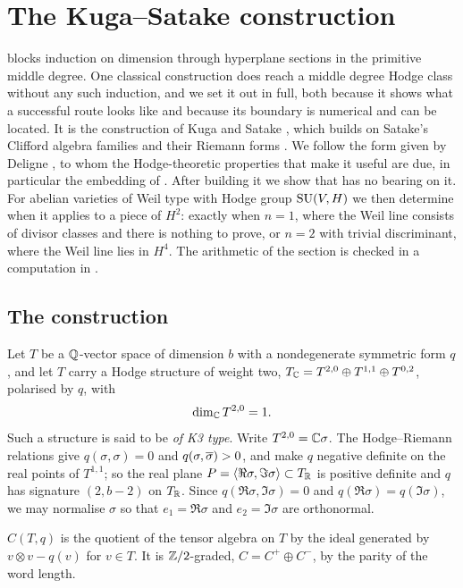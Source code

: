 \section{The Kuga--Satake construction}\label{sec:ks}

 blocks induction on dimension through hyperplane
sections in the primitive middle degree. One classical construction does reach
a middle degree Hodge class without any such induction, and we set it out in
full, both because it shows what a successful route looks like and because
its boundary is numerical and can be located. It is the construction of Kuga
and Satake \cite{KS67}, which builds on Satake's Clifford algebra families and
their Riemann forms \cite{Sat66}. We follow the form given by Deligne
\cite{Del72}, to whom the Hodge-theoretic properties that make it useful are
due, in particular the embedding of . After building it we
show that  has no bearing on it. For abelian varieties of
Weil type with Hodge group $\operatorname{SU}(V,H)$ we then determine when it applies to a
piece of $H^{2}$: exactly when $n=1$, where the Weil line consists of divisor
classes and there is nothing to prove, or $n=2$ with trivial discriminant,
where the Weil line lies in $H^{4}$. The arithmetic of the
section is checked in a computation in \cite{BMB26}.

\subsection{The construction}

\begin{setupenv}[K3 type]\label{setup:k3type}
Let $T$ be a $\mathbb{Q}$-vector space of dimension $b$ with a nondegenerate
symmetric form $q$, and let $T$ carry a Hodge structure of weight two,
$T_{\mathbb{C}}=T^{2,0}\oplus T^{1,1}\oplus T^{0,2}$, polarised by $q$, with
\[
  \dim_{\mathbb{C}}T^{2,0}=1 .
\]
Such a structure is said to be \emph{of K3 type}. Write $T^{2,0}=\mathbb{C}\sigma$.
The Hodge--Riemann relations give $q(\sigma,\sigma)=0$ and
$q(\sigma,\overline{\sigma})>0$, and make $q$ negative definite on the real points
of $T^{1,1}$; so the real plane
$P=\langle\Re\sigma,\Im\sigma\rangle\subset T_{\mathbb{R}}$ is positive definite and
$q$ has signature $(2,b-2)$ on $T_{\mathbb{R}}$. Since $q(\Re\sigma,\Im\sigma)=0$
and $q(\Re\sigma)=q(\Im\sigma)$, we may normalise $\sigma$ so that
$e_{1}=\Re\sigma$ and $e_{2}=\Im\sigma$ are orthonormal.
\end{setupenv}

\begin{definition}\label{def:clifford}
$C(T,q)$ is the quotient of the tensor algebra on $T$ by the ideal generated
by $v\otimes v-q(v)$ for $v\in T$. It is $\mathbb{Z}/2$-graded, $C=C^{+}\oplus C^{-}$,
by the parity of the word length.
\end{definition}

